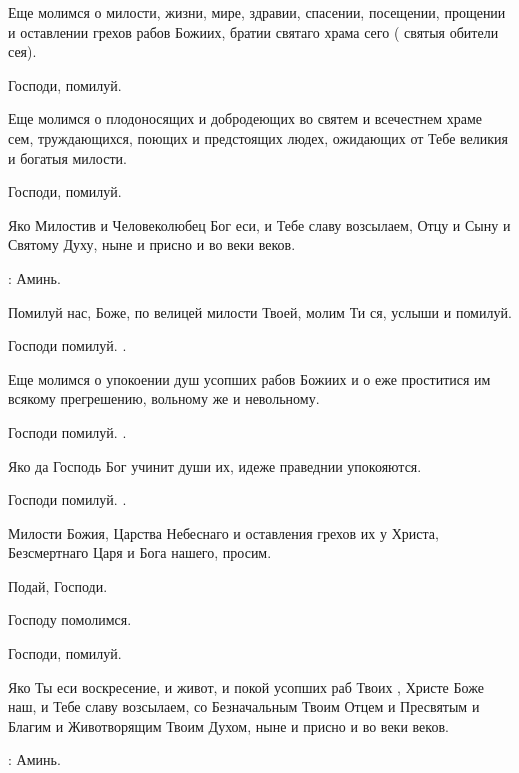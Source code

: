 \begin{mymulticols}
 Еще молимся о милости, жизни, мире, здравии, спасении, посещении, прощении и оставлении грехов рабов Божиих, братии святаго храма сего (  святыя обители сея). 

 Господи, помилуй.  

 Еще молимся о плодоносящих и добродеющих во святем и всечестнем храме сем, труждающихся, поющих и предстоящих людех, ожидающих от Тебе великия и богатыя милости.

 Господи, помилуй.  

 Яко Милостив и Человеколюбец Бог еси, и Тебе славу возсылаем, Отцу и Сыну и Святому Духу, ныне и присно и во веки веков.

: Аминь.



 Помилуй нас, Боже, по велицей милости Твоей, молим Ти ся, услыши и помилуй.

 Господи помилуй. . 

 Еще молимся о упокоении душ усопших рабов Божиих  и о еже проститися им всякому прегрешению, вольному же и невольному.

 Господи помилуй. . 

 Яко да Господь Бог учинит души их, идеже праведнии упокояются.

 Господи помилуй. . 

 Милости Божия, Царства Небеснаго и оставления грехов их у Христа, Безсмертнаго Царя и Бога нашего, просим.

 Подай, Господи.

 Господу помолимся.

 Господи, помилуй.

 Яко Ты еси воскресение, и живот, и покой усопших раб Твоих , Христе Боже наш, и Тебе славу возсылаем, со Безначальным Твоим Отцем и Пресвятым и Благим и Животворящим Твоим Духом, ныне и присно и во веки веков.

: Аминь. 


\end{mymulticols}
